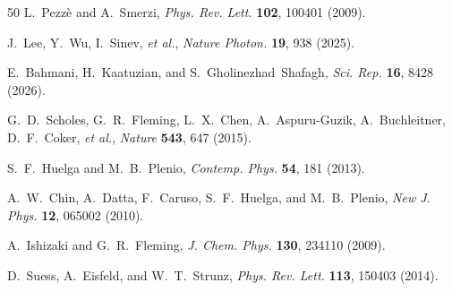 \documentclass[twocolumn]{article}
\begin{document}
\begin{thebibliography}{50}
L.~Pezz\`{e} and A.~Smerzi, \textit{Phys. Rev. Lett.} \textbf{102}, 100401 (2009).

J.~Lee, Y.~Wu, I.~Sinev, \textit{et al.}, \textit{Nature Photon.} \textbf{19}, 938 (2025).

E.~Bahmani, H.~Kaatuzian, and S.~Gholinezhad~Shafagh, \textit{Sci. Rep.} \textbf{16}, 8428 (2026).

G.~D.~Scholes, G.~R.~Fleming, L.~X.~Chen, A.~Aspuru-Guzik, A.~Buchleitner, D.~F.~Coker, \textit{et al.}, \textit{Nature} \textbf{543}, 647 (2015).

S.~F.~Huelga and M.~B.~Plenio, \textit{Contemp. Phys.} \textbf{54}, 181 (2013).

A.~W.~Chin, A.~Datta, F.~Caruso, S.~F.~Huelga, and M.~B.~Plenio, \textit{New J. Phys.} \textbf{12}, 065002 (2010).

A.~Ishizaki and G.~R.~Fleming, \textit{J. Chem. Phys.} \textbf{130}, 234110 (2009).

D.~Suess, A.~Eisfeld, and W.~T.~Strunz, \textit{Phys. Rev. Lett.} \textbf{113}, 150403 (2014).

\end{thebibliography}
\end{document}
